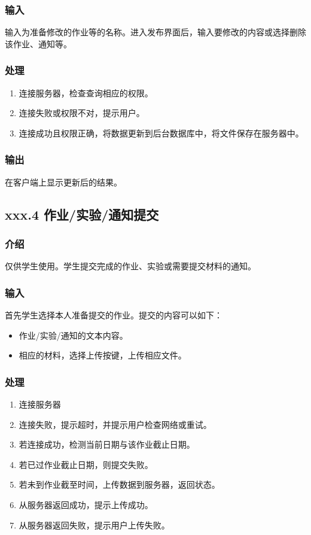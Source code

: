       \subsubsection{输入}
      输入为准备修改的作业等的名称。进入发布界面后，输入要修改的内容或选择删除该作业、通知等。
      \subsubsection{处理}
      \begin{enumerate}
        \item 连接服务器，检查查询相应的权限。
        \item 连接失败或权限不对，提示用户。
        \item 连接成功且权限正确，将数据更新到后台数据库中，将文件保存在服务器中。
      \end{enumerate}
      \subsubsection{输出}
      在客户端上显示更新后的结果。

    \subsection{xxx.4 作业/实验/通知提交}
      \subsubsection{介绍}
      仅供学生使用。学生提交完成的作业、实验或需要提交材料的通知。
      \subsubsection{输入}
      首先学生选择本人准备提交的作业。提交的内容可以如下：
      \begin{itemize}
        \item 作业/实验/通知的文本内容。
        \item 相应的材料，选择上传按键，上传相应文件。
      \end{itemize}
      \subsubsection{处理}
      \begin{enumerate}
        \item 连接服务器
        \item 连接失败，提示超时，并提示用户检查网络或重试。
        \item 若连接成功，检测当前日期与该作业截止日期。
        \item 若已过作业截止日期，则提交失败。
        \item 若未到作业截至时间，上传数据到服务器，返回状态。
        \item 从服务器返回成功，提示上传成功。
        \item 从服务器返回失败，提示用户上传失败。
      \end{enumerate}
